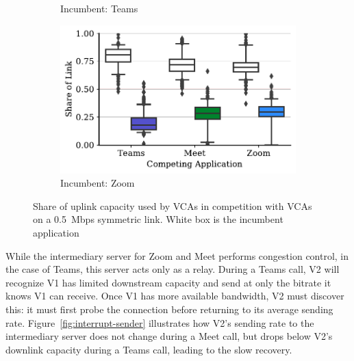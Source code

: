 \begin{figure}[t!]
\begin{subfigure}[t]{.33\textwidth}
        \caption{Incumbent: Teams}
        \label{subfig:teams_ul_box}
    \end{subfigure}
    \begin{subfigure}[t]{.33\textwidth}
        \centering
        \includegraphics[width=1\textwidth]{figures/comp/box_plot_zoom_ul_0.5_all.pdf}
        \caption{Incumbent: Zoom}
        \label{fig:zoom_ul_box}
    \end{subfigure}
    \caption{Share of uplink capacity used by VCAs in competition with VCAs on a 0.5~Mbps symmetric link. White box is the incumbent application}
    \label{fig:boxplot-upld}
\end{figure}

While the intermediary server for Zoom and Meet performs congestion control,
in the case of Teams, this server acts only as a relay. During a
Teams call, V2 will recognize V1 has limited downstream capacity and 
send at only the bitrate it knows V1 can receive.
Once V1 has more available bandwidth, V2 must discover this: it must first
probe the connection before returning to its average sending rate.
Figure~\ref{fig:interrupt-sender} illustrates how V2's sending rate to the intermediary server does not
change during a Meet call, but drops below V2's downlink capacity during a
Teams call, leading to the slow recovery.

